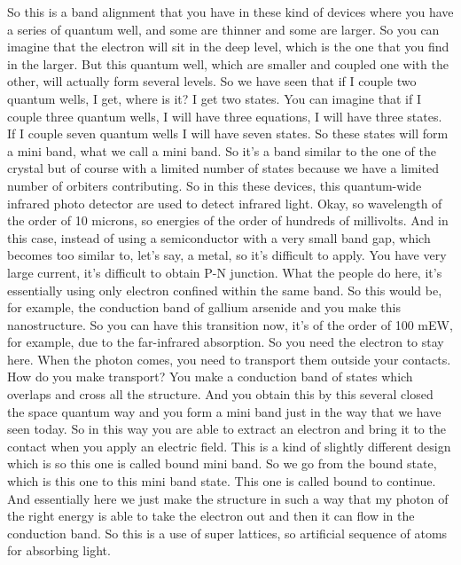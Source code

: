 So this is a band alignment that you have in these kind of devices where you have a series of quantum well, and some are thinner and some are larger. So you can imagine that the electron will sit in the deep level, which is the one that you find in the larger. But this quantum well, which are smaller and coupled one with the other, will actually form several levels. So we have seen that if I couple two quantum wells, I get, where is it? I get two states. You can imagine that if I couple three quantum wells, I will have three equations, I will have three states. If I couple seven quantum wells I will have seven states. So these states will form a mini band, what we call a mini band. So it's a band similar to the one of the crystal but of course with a limited number of states because we have a limited number of orbiters contributing. So in this these devices, this quantum-wide infrared photo detector are used to detect infrared light.
Okay, so wavelength of the order of 10 microns, so energies of the order of hundreds of millivolts. And in this case, instead of using a semiconductor with a very small band gap, which becomes too similar to, let's say, a metal, so it's difficult to apply. You have very large current, it's difficult to obtain P-N junction. What the people do here, it's essentially using only electron confined within the same band. So this would be, for example, the conduction band of gallium arsenide and you make this nanostructure. So you can have this transition now, it's of the order of 100 mEW, for example, due to the far-infrared absorption. So you need the electron to stay here. When the photon comes, you need to transport them outside your contacts. How do you make transport? You make a conduction band of states which overlaps and cross all the structure. And you obtain this by this several closed the space quantum way and you form a mini band just in the way that we have seen today. So in this way you are able to extract an electron and bring it to the contact when you apply an electric field. This is a kind of slightly different design which is so this one is called bound mini band. So we go from the bound state, which is this one to this mini band state. This one is called bound to continue. And essentially here we just make the structure in such a way that my photon of the right energy is able to take the electron out and then it can flow in the conduction band. So this is a use of super lattices, so artificial sequence of atoms for absorbing light.
